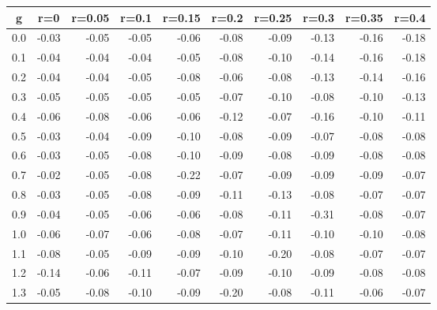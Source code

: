 %
\begin{table}[!tbp]
 \begin{center}
 \begin{tabular}{rrrrrrrrrr}\hline\hline
\multicolumn{1}{c}{g}&\multicolumn{1}{c}{r=0}&\multicolumn{1}{c}{r=0.05}&\multicolumn{1}{c}{r=0.1}&\multicolumn{1}{c}{r=0.15}&\multicolumn{1}{c}{r=0.2}&\multicolumn{1}{c}{r=0.25}&\multicolumn{1}{c}{r=0.3}&\multicolumn{1}{c}{r=0.35}&\multicolumn{1}{c}{r=0.4}\tabularnewline
\hline
0.0&-0.03&-0.05&-0.05&-0.06&-0.08&-0.09&-0.13&-0.16&-0.18\tabularnewline
0.1&-0.04&-0.04&-0.04&-0.05&-0.08&-0.10&-0.14&-0.16&-0.18\tabularnewline
0.2&-0.04&-0.04&-0.05&-0.08&-0.06&-0.08&-0.13&-0.14&-0.16\tabularnewline
0.3&-0.05&-0.05&-0.05&-0.05&-0.07&-0.10&-0.08&-0.10&-0.13\tabularnewline
0.4&-0.06&-0.08&-0.06&-0.06&-0.12&-0.07&-0.16&-0.10&-0.11\tabularnewline
0.5&-0.03&-0.04&-0.09&-0.10&-0.08&-0.09&-0.07&-0.08&-0.08\tabularnewline
0.6&-0.03&-0.05&-0.08&-0.10&-0.09&-0.08&-0.09&-0.08&-0.08\tabularnewline
0.7&-0.02&-0.05&-0.08&-0.22&-0.07&-0.09&-0.09&-0.09&-0.07\tabularnewline
0.8&-0.03&-0.05&-0.08&-0.09&-0.11&-0.13&-0.08&-0.07&-0.07\tabularnewline
0.9&-0.04&-0.05&-0.06&-0.06&-0.08&-0.11&-0.31&-0.08&-0.07\tabularnewline
1.0&-0.06&-0.07&-0.06&-0.08&-0.07&-0.11&-0.10&-0.10&-0.08\tabularnewline
1.1&-0.08&-0.05&-0.09&-0.09&-0.10&-0.20&-0.08&-0.07&-0.07\tabularnewline
1.2&-0.14&-0.06&-0.11&-0.07&-0.09&-0.10&-0.09&-0.08&-0.08\tabularnewline
1.3&-0.05&-0.08&-0.10&-0.09&-0.20&-0.08&-0.11&-0.06&-0.07\tabularnewline
\hline
\end{tabular}

\end{center}

\end{table}

